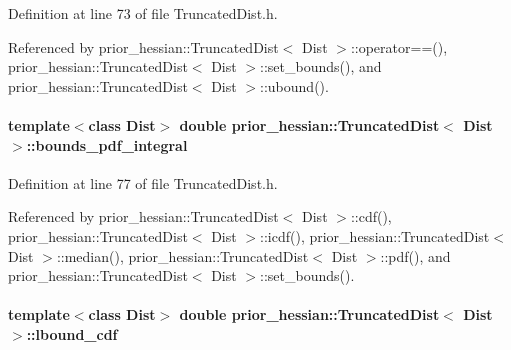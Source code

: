 Definition at line 73 of file Truncated\+Dist.\+h.



Referenced by prior\+\_\+hessian\+::\+Truncated\+Dist$<$ Dist $>$\+::operator==(), prior\+\_\+hessian\+::\+Truncated\+Dist$<$ Dist $>$\+::set\+\_\+bounds(), and prior\+\_\+hessian\+::\+Truncated\+Dist$<$ Dist $>$\+::ubound().

\paragraph[{\texorpdfstring{bounds\+\_\+pdf\+\_\+integral}{bounds_pdf_integral}}]{\setlength{\rightskip}{0pt plus 5cm}template$<$class Dist$>$ double {\bf prior\+\_\+hessian\+::\+Truncated\+Dist}$<$ Dist $>$\+::bounds\+\_\+pdf\+\_\+integral\hspace{0.3cm}{\ttfamily [protected]}}\hypertarget{classprior__hessian_1_1TruncatedDist_a5670fabde8feb0c09ca92ef5dfeba3a6}{}\label{classprior__hessian_1_1TruncatedDist_a5670fabde8feb0c09ca92ef5dfeba3a6}


Definition at line 77 of file Truncated\+Dist.\+h.



Referenced by prior\+\_\+hessian\+::\+Truncated\+Dist$<$ Dist $>$\+::cdf(), prior\+\_\+hessian\+::\+Truncated\+Dist$<$ Dist $>$\+::icdf(), prior\+\_\+hessian\+::\+Truncated\+Dist$<$ Dist $>$\+::median(), prior\+\_\+hessian\+::\+Truncated\+Dist$<$ Dist $>$\+::pdf(), and prior\+\_\+hessian\+::\+Truncated\+Dist$<$ Dist $>$\+::set\+\_\+bounds().

\paragraph[{\texorpdfstring{lbound\+\_\+cdf}{lbound_cdf}}]{\setlength{\rightskip}{0pt plus 5cm}template$<$class Dist$>$ double {\bf prior\+\_\+hessian\+::\+Truncated\+Dist}$<$ Dist $>$\+::lbound\+\_\+cdf\hspace{0.3cm}{\ttfamily [protected]}}\hypertarget{classprior__hessian_1_1TruncatedDist_a2de07a8235d9853a6dfe265fb2ec1ad4}{}\label{classprior__hessian_1_1TruncatedDist_a2de07a8235d9853a6dfe265fb2ec1ad4}


